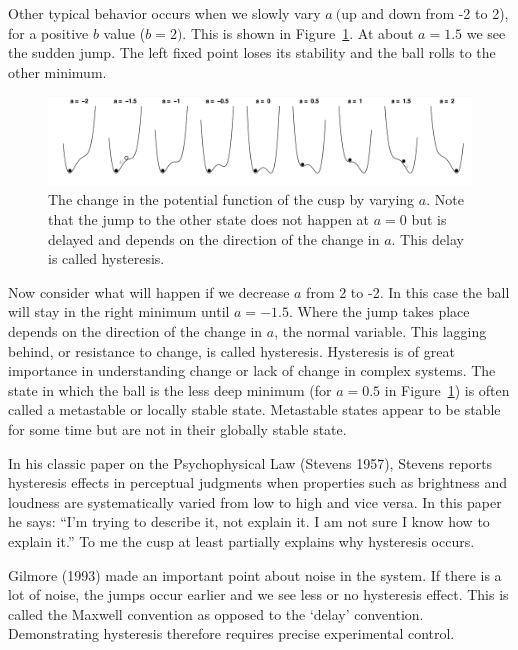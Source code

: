 \documentclass[
  a4paper,
  DIV=11,
  numbers=noendperiod,
  oneside]{scrreprt}
\begin{document}
Other typical behavior occurs when we slowly vary \(a\ (\)up and down
from -2 to 2), for a positive \(b\) value (\(b = 2).\) This is shown in
Figure~\ref{fig-ch3-img7-old-19}. At about \(a = 1.5\) we see the sudden
jump. The left fixed point loses its stability and the ball rolls to the
other minimum.

\begin{figure}

{\centering \includegraphics{media/ch3/image7.jpg}

}

\caption{\label{fig-ch3-img7-old-19}The change in the potential function
of the cusp by varying \(a\). Note that the jump to the other state does
not happen at \(a=0\) but is delayed and depends on the direction of the
change in \(a\). This delay is called hysteresis.}

\end{figure}

Now consider what will happen if we decrease \(a\) from 2 to -2. In this
case the ball will stay in the right minimum until \(a = - 1.5\). Where
the jump takes place depends on the direction of the change in \(a\),
the normal variable. This lagging behind, or resistance to change, is
called hysteresis. Hysteresis is of great importance in understanding
change or lack of change in complex systems. The state in which the ball
is the less deep minimum (for \(a = 0.5\) in
Figure~\ref{fig-ch3-img7-old-19}) is often called a metastable or
locally stable state. Metastable states appear to be stable for some
time but are not in their globally stable state.

In his classic paper on the Psychophysical Law (Stevens 1957), Stevens
reports hysteresis effects in perceptual judgments when properties such
as brightness and loudness are systematically varied from low to high
and vice versa. In this paper he says: ``I'm trying to describe it, not
explain it. I am not sure I know how to explain it.'' To me the cusp at
least partially explains why hysteresis occurs.

Gilmore (1993) made an important point about noise in the system. If
there is a lot of noise, the jumps occur earlier and we see less or no
hysteresis effect. This is called the Maxwell convention as opposed to
the `delay' convention. Demonstrating hysteresis therefore requires
precise experimental control.
\end{document}
